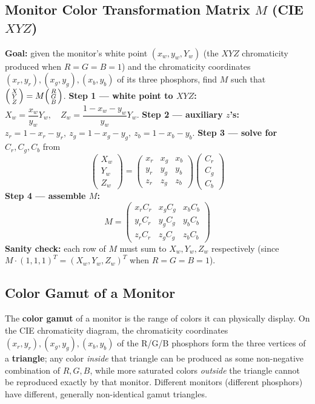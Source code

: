 \documentclass[12pt, a4paper]{article}
\newenvironment{answerbox}{\begin{mdframed}[style=answerframe]}{\end{mdframed}}
\begin{document}
\subsection{Monitor Color Transformation Matrix $M$ (CIE $XYZ$)}
\begin{answerbox}
\textbf{Goal:} given the monitor's white point $(x_w,y_w,Y_w)$ (the $XYZ$ chromaticity produced when $R=G=B=1$) and the chromaticity coordinates $(x_r,y_r),(x_g,y_g),(x_b,y_b)$ of its three phosphors, find $M$ such that $\begin{psmallmatrix}X\\Y\\Z\end{psmallmatrix}=M\begin{psmallmatrix}R\\G\\B\end{psmallmatrix}$.
\textbf{Step 1 --- white point to $XYZ$:} $X_w = \dfrac{x_w}{y_w}Y_w,\quad Z_w=\dfrac{1-x_w-y_w}{y_w}Y_w$.
\textbf{Step 2 --- auxiliary $z$'s:} $z_r=1-x_r-y_r,\ z_g=1-x_g-y_g,\ z_b=1-x_b-y_b$.
\textbf{Step 3 --- solve for $C_r,C_g,C_b$} from
$$\begin{pmatrix}X_w\\Y_w\\Z_w\end{pmatrix}=\begin{pmatrix}x_r&x_g&x_b\\y_r&y_g&y_b\\z_r&z_g&z_b\end{pmatrix}\begin{pmatrix}C_r\\C_g\\C_b\end{pmatrix}$$
\textbf{Step 4 --- assemble $M$:}
$$M=\begin{pmatrix}x_rC_r&x_gC_g&x_bC_b\\y_rC_r&y_gC_g&y_bC_b\\z_rC_r&z_gC_g&z_bC_b\end{pmatrix}$$
\textbf{Sanity check:} each row of $M$ must sum to $X_w,Y_w,Z_w$ respectively (since $M\cdot(1,1,1)^T=(X_w,Y_w,Z_w)^T$ when $R=G=B=1$).
\end{answerbox}

\subsection{Color Gamut of a Monitor}
\begin{answerbox}
The \textbf{color gamut} of a monitor is the range of colors it can physically display. On the CIE chromaticity diagram, the chromaticity coordinates $(x_r,y_r),(x_g,y_g),(x_b,y_b)$ of the R/G/B phosphors form the three vertices of a \textbf{triangle}; any color \emph{inside} that triangle can be produced as some non-negative combination of $R,G,B$, while more saturated colors \emph{outside} the triangle cannot be reproduced exactly by that monitor. Different monitors (different phosphors) have different, generally non-identical gamut triangles.
\end{answerbox}
\end{document}
